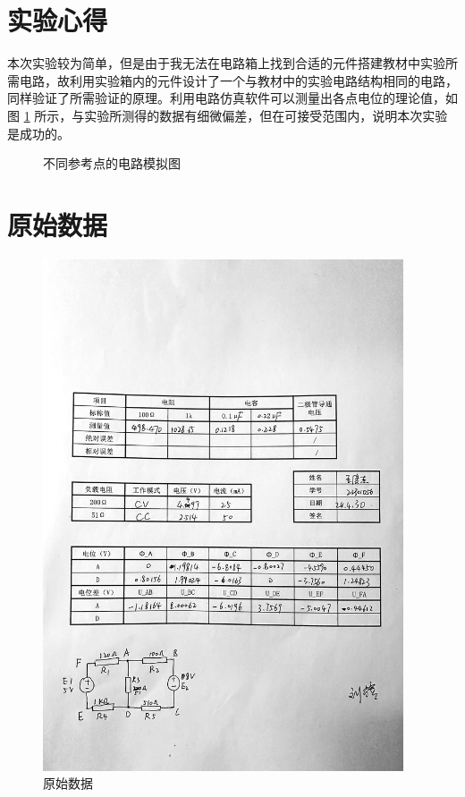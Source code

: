 \documentclass[a4paper,utf8]{article}
\begin{document}
\section{实验心得}
本次实验较为简单，但是由于我无法在电路箱上找到合适的元件搭建教材中实验所需电路，故利用实验箱内的元件设计了一个与教材中的实验电路结构相同的电路，同样验证了所需验证的原理。利用电路仿真软件可以测量出各点电位的理论值，如图 \ref{fig:A} 所示，与实验所测得的数据有细微偏差，但在可接受范围内，说明本次实验是成功的。
\begin{figure}[!ht]
    \caption{不同参考点的电路模拟图}\label{fig:A}
     \hspace{5mm}
\end{figure}
\newpage
\section{原始数据}
\begin{figure}[!ht]
    \caption{原始数据}
    \includegraphics[width=0.95\textwidth]{rawdata.jpg}
\end{figure}
\end{document}
